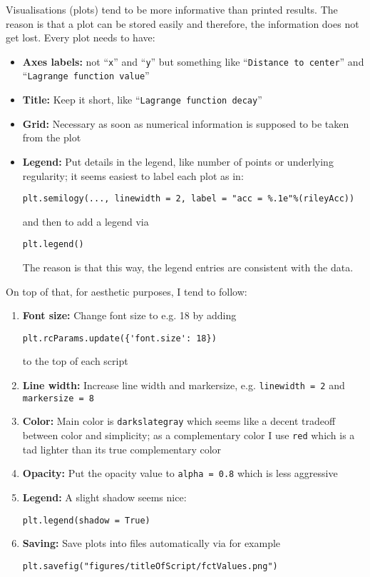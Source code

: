 \documentclass[11pt]{article}
\begin{document}
Visualisations (plots) tend to be more informative than printed results. The reason is that a plot can be stored easily and therefore, the information does not get lost. Every plot needs to have:
\begin{itemize}
\item \textbf{Axes labels:} not ``\texttt{x}'' and ``\texttt{y}'' but something like ``\texttt{Distance to center}'' and ``\texttt{Lagrange function value}''
\item \textbf{Title:} Keep it short, like ``\texttt{Lagrange function decay}''
\item \textbf{Grid:} Necessary as soon as numerical information is supposed to be taken from the plot
\item \textbf{Legend:} Put details in the legend, like number of points or underlying regularity; it seems easiest to label each plot as in:
\begin{Verbatim}[formatcom=\color{blue!50!black}]
plt.semilogy(..., linewidth = 2, label = "acc = %.1e"%(rileyAcc))
\end{Verbatim}
and then to add a legend via
\begin{Verbatim}[formatcom=\color{blue!50!black}]
plt.legend()
\end{Verbatim}
The reason is that this way, the legend entries are consistent with the data.
\end{itemize}
On top of that, for aesthetic purposes, I tend to follow:
\begin{enumerate}
\item \textbf{Font size:} Change font size to e.g. 18 by adding
\begin{Verbatim}[formatcom=\color{blue!50!black}]
plt.rcParams.update({'font.size': 18})
\end{Verbatim}
to the top of each script
\item \textbf{Line width:} Increase line width and markersize, e.g. \verb+linewidth = 2+ and \verb+markersize = 8+
\item \textbf{Color:} Main color is \texttt{darkslategray} which seems like a decent tradeoff between color and simplicity; as a complementary color I use \texttt{red} which is a tad lighter than its true complementary color
\item \textbf{Opacity:} Put the opacity value to \verb+alpha = 0.8+ which is less aggressive
\item \textbf{Legend:} A slight shadow seems nice:
\begin{Verbatim}[formatcom=\color{blue!50!black}]
plt.legend(shadow = True)
\end{Verbatim}
\item \textbf{Saving:} Save plots into files automatically via for example
\begin{Verbatim}[formatcom=\color{blue!50!black}]
plt.savefig("figures/titleOfScript/fctValues.png")
\end{Verbatim}

\end{enumerate}
\end{document}

